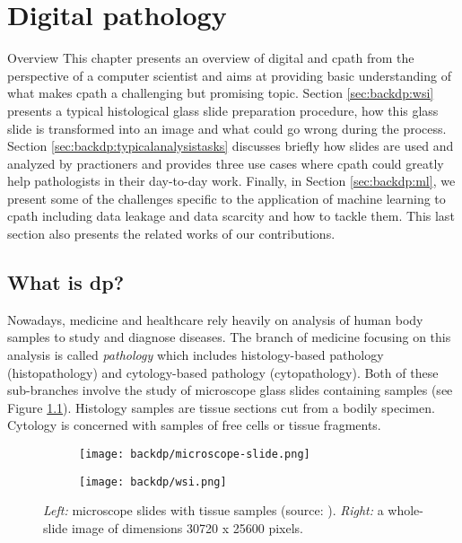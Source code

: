 \chapter{Digital pathology}
\label{chap:backdp}

\begin{overview}{Overview}
  This chapter presents an overview of digital and \acrlong{cpath} from the perspective of a computer scientist and aims at providing basic understanding of what makes \acrlong{cpath} a challenging but promising topic. Section \ref{sec:backdp:wsi} presents a typical histological glass slide preparation procedure, how this glass slide is transformed into an image and what could go wrong during the process. Section \ref{sec:backdp:typicalanalysistasks} discusses briefly how slides are used and analyzed by practioners and provides three use cases where \acrlong{cpath} could greatly help pathologists in their day-to-day work. Finally, in Section \ref{sec:backdp:ml}, we present some of the challenges specific to the application of machine learning to \acrlong{cpath} including data leakage and data scarcity and how to tackle them. This last section also presents the related works of our contributions.
\end{overview}


\section{What is \acrlong{dp}?}
\label{sec:backdp:whatisdp}

Nowadays, medicine and healthcare rely heavily on analysis of human body samples to study and diagnose diseases. The branch of medicine focusing on this analysis is called \textit{pathology} which includes histology-based pathology (\aka histopathology) and cytology-based pathology (\aka cytopathology). Both of these sub-branches involve the study of microscope glass slides containing samples (see Figure \ref{fig:backdp:glassslides}). Histology samples are tissue sections cut from a bodily specimen. Cytology is concerned with samples of free cells or tissue fragments.

\begin{figure}
  \centering
  \begin{subfigure}[t]{0.48\textwidth}
    \centering
    \texttt{[image: backdp/microscope-slide.png]}
  \end{subfigure}
  \begin{subfigure}[t]{0.48\textwidth}
    \centering
    \texttt{[image: backdp/wsi.png]}
  \end{subfigure}
  \caption{\textit{Left:} microscope slides with tissue samples (source: \cite{img:glassslides}). \textit{Right:} a whole-slide image of dimensions 30720 x 25600 pixels.}
  \label{fig:backdp:glassslides}
\end{figure}

